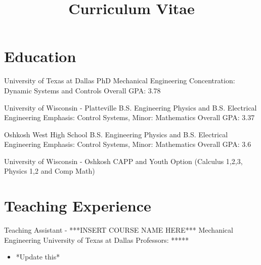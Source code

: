 \documentclass[11pt,letterpaper,roman]{moderncv} %
\title{Curriculum Vitae}
\begin{document}

\makecvtitle %

\vspace{- 0.5 cm}

\section{Education}

{University of Texas at Dallas}
{PhD Mechanical Engineering}{}
{Concentration: Dynamic Systems and Controls} 
{Overall GPA: 3.78}

{University of Wisconsin - Platteville}
{B.S. Engineering Physics and  B.S. Electrical Engineering}{}
{Emphasis: Control Systems, Minor: Mathematics} 
{Overall GPA: 3.37}

{Oshkosh West High School}
{B.S. Engineering Physics and  B.S. Electrical Engineering}{}
{Emphasis: Control Systems, Minor: Mathematics} 
{Overall GPA: 3.6}

{University of Wisconsin - Oshkosh}
{CAPP and Youth Option}
{(Calculus 1,2,3, Physics 1,2 and Comp Math)}{}{}


\section{Teaching Experience}

{Teaching Assistant - ***INSERT COURSE NAME HERE***}
{Mechanical Engineering}
{University of Texas at Dallas}
{Professors: *****}
{\begin{itemize}
    \item *Update this*
\end{itemize}
}
\end{document}
